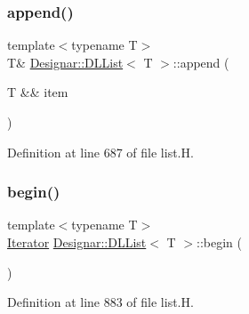 \mbox{\label{class_designar_1_1_d_l_list_a62918b133f72c5fa1c580f823642e5fa}} 
\subsubsection{\texorpdfstring{append()}{append()}\hspace{0.1cm}{\footnotesize\ttfamily [2/2]}}
{\footnotesize\ttfamily template$<$typename T$>$ \\
T\& \hyperlink{class_designar_1_1_d_l_list}{Designar\+::\+D\+L\+List}$<$ T $>$\+::append (\begin{DoxyParamCaption}\item[{T \&\&}]{item }\end{DoxyParamCaption})\hspace{0.3cm}{\ttfamily [inline]}}



Definition at line 687 of file list.\+H.

\mbox{\label{class_designar_1_1_d_l_list_a1c011ca480554788280073fcdf6804c6}} 
\subsubsection{\texorpdfstring{begin()}{begin()}\hspace{0.1cm}{\footnotesize\ttfamily [1/2]}}
{\footnotesize\ttfamily template$<$typename T$>$ \\
\hyperlink{class_designar_1_1_d_l_list_1_1_iterator}{Iterator} \hyperlink{class_designar_1_1_d_l_list}{Designar\+::\+D\+L\+List}$<$ T $>$\+::begin (\begin{DoxyParamCaption}{ }\end{DoxyParamCaption})\hspace{0.3cm}{\ttfamily [inline]}}



Definition at line 883 of file list.\+H.

\mbox{\label{class_designar_1_1_d_l_list_a5fa0fa23f4ab881a04be6786de312dad}} 
